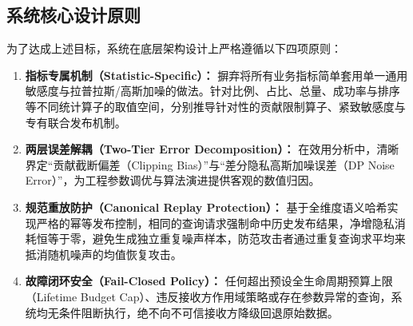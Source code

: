 \subsection{系统核心设计原则}
为了达成上述目标，系统在底层架构设计上严格遵循以下四项原则：
\begin{enumerate}[label=\textbf{原则\arabic*：}, leftmargin=4.5em]
  \item \textbf{指标专属机制（Statistic-Specific）：} 摒弃将所有业务指标简单套用单一通用敏感度与拉普拉斯/高斯加噪的做法。针对比例、占比、总量、成功率与排序等不同统计算子的取值空间，分别推导针对性的贡献限制算子、紧致敏感度与专有联合发布机制。
  \item \textbf{两层误差解耦（Two-Tier Error Decomposition）：} 在效用分析中，清晰界定“贡献截断偏差（Clipping Bias）”与“差分隐私高斯加噪误差（DP Noise Error）”，为工程参数调优与算法演进提供客观的数值归因。
  \item \textbf{规范重放防护（Canonical Replay Protection）：} 基于全维度语义哈希实现严格的幂等发布控制，相同的查询请求强制命中历史发布结果，净增隐私消耗恒等于零，避免生成独立重复噪声样本，防范攻击者通过重复查询求平均来抵消随机噪声的均值恢复攻击。
  \item \textbf{故障闭环安全（Fail-Closed Policy）：} 任何超出预设全生命周期预算上限（Lifetime Budget Cap）、违反接收方作用域策略或存在参数异常的查询，系统均无条件阻断执行，绝不向不可信接收方降级回退原始数据。
\end{enumerate}
